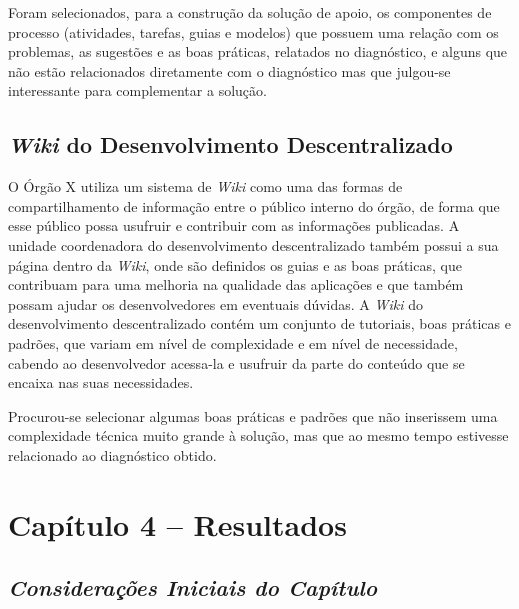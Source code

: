 Foram selecionados, para a construção da solução de apoio, os componentes de processo (atividades, tarefas, guias e modelos) que possuem uma relação com os problemas, as sugestões e as boas práticas, relatados no diagnóstico, e alguns que não estão relacionados diretamente com o diagnóstico mas que julgou-se interessante para complementar a solução.

\section{\textit{Wiki} do Desenvolvimento Descentralizado}

O Órgão X utiliza um sistema de \textit{Wiki} como uma das formas de compartilhamento de informação entre o público interno do órgão, de forma que esse público possa usufruir e contribuir com as informações publicadas. A unidade coordenadora do desenvolvimento descentralizado também possui a sua página dentro da \textit{Wiki}, onde são definidos os guias e as boas práticas, que contribuam para uma melhoria na qualidade das aplicações e que também possam ajudar os desenvolvedores em eventuais dúvidas. A \textit{Wiki} do desenvolvimento descentralizado contém um conjunto de tutoriais, boas práticas e padrões, que variam em nível de complexidade e em nível de necessidade, cabendo ao desenvolvedor acessa-la e usufruir da parte do conteúdo que se encaixa nas suas necessidades.

Procurou-se selecionar algumas boas práticas e padrões que não inserissem uma complexidade técnica muito grande à solução, mas que ao mesmo tempo estivesse relacionado ao diagnóstico obtido.

\chapter[Capítulo 4 – Resultados]{Capítulo 4 – Resultados}

\section{\textit{Considerações Iniciais do Capítulo}}

